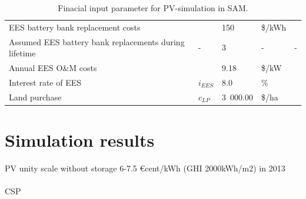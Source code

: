 \documentclass[Master,MEE,english]{twbook}%
\begin{document}
\begin{table}[!h]
\begin{tabular}{  p{5.5cm} C{1.5cm} C{1.5cm}  C{1.5cm}  C{4.0cm} }
EES battery bank replacement costs & & 150 & \$/kWh & \cite{Zakeri2015} \\ 
Assumed EES battery bank replacements during lifetime & - & 3 & - & - \\ 
Annual EES O\&M costs & & 9.18 & \$/kW & \cite{Zakeri2015}\\
Interest rate of EES & $i_{EES}$& 8.0 & \% & \cite{Zakeri2015} \\ \hline
Land purchase &$c_{LP}$ & 3~000.00 & \$/ha & \cite{Cassell2012} \\ 
\hline
\end{tabular}
\caption[Finacial input parameter for PV-simulation in SAM.]{Finacial input parameter for PV-simulation in SAM.}\label{tbl: PVFinance}
\end{table}
\pagebreak
\section{Simulation results}
PV unity scale without storage 
6-7.5 €cent/kWh (GHI 2000kWh/m2) in 2013 \cite{FraunhoferISE2013}\\\\
CSP 
\end{document}
